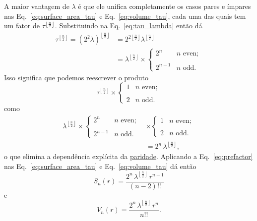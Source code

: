 {A maior vantagem de $\lambda$ é que ele unifica completamente os casos pares e ímpares nas Eq.~\eqref{eq:surface_area_tau} e Eq.~\eqref{eq:volume_tau}, cada uma das quais tem um fator de $\tau^{\left\lfloor \frac{n}{2} \right\rfloor}$. Substituindo na Eq.~\eqref{eq:tau_lambda} então dá
\[
\begin{split}
\tau^{\left\lfloor \frac{n}{2} \right\rfloor} = (2^2\lambda)^{\left\lfloor \frac{n}{2} \right\rfloor} & = 2^{2\left\lfloor \frac{n}{2} \right\rfloor} \lambda^{\left\lfloor \frac{n}{2} \right\rfloor} \\
& = \lambda^{\left\lfloor \frac{n}{2} \right\rfloor}\times
\begin{cases}
 2^n & n \text{ even}; \\ \\
 2^{n-1} & n \text{ odd}.
 \end{cases}
 \end{split}
\]
Isso significa que podemos reescrever o produto
\[
\tau^{\left\lfloor \frac{n}{2} \right\rfloor}\times \begin{cases}
1 & n \text{ even}; \\ \\
2 & n \text{ odd}.
\end{cases}
\]
como
\begin{equation}
\label{eq:prefactor}
\begin{split}
\lambda^{\left\lfloor \frac{n}{2} \right\rfloor} \times
\begin{cases}
 2^n & n \text{ even}; \\ \\
 2^{n-1} & n \text{ odd}.
 \end{cases}
 & \times
\begin{cases}
 1 & n \text{ even}; \\ \\
 2 & n \text{ odd}.
 \end{cases}
\\ & = 2^n\,\lambda^{\left\lfloor \frac{n}{2} \right\rfloor},
\end{split}
\end{equation}
o que elimina a dependência explícita da \href{https://pt.wikipedia.org/wiki/N%C3%BAmeros_pares_e_%C3%ADmpares}{paridade}. Aplicando a Eq.~\eqref{eq:prefactor} nas \linebreak Eq.~\eqref{eq:surface_area_tau} e Eq.~\eqref{eq:volume_tau} dá então
\begin{equation}
\label{eq:surface_area_lambda}
S_n(r) = \frac{2^n\,\lambda^{\left\lfloor \frac{n}{2} \right\rfloor}\,r^{n-1}}{(n-2)!!}
\end{equation}
e
\begin{equation}
\label{eq:volume_lambda}
V_n(r) = \frac{2^n\,\lambda^{\left\lfloor \frac{n}{2} \right\rfloor}\,r^n}{n!!}.
\end{equation}

}

